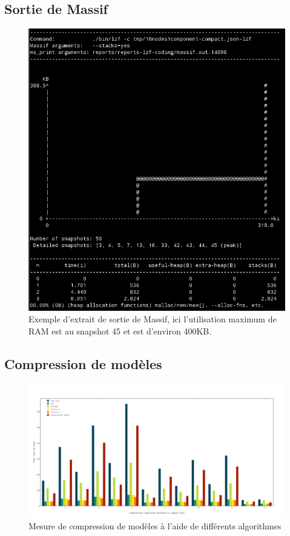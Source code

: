 \subsection{\label{massif}Sortie de Massif}
\begin{figure}[ht!]
\centering
\includegraphics[scale=0.7]{images/msprint.png}
\caption{Exemple d'extrait de sortie de Massif, ici l'utilisation maximum de RAM est au snapshot 45 et est d'environ 400KB.}
\end{figure}

\begin{landscape}
\subsection{\label{comp-tabde}Compression de modèles}
\begin{figure}[ht!]
\centering
\includegraphics[scale=0.45]{images/compression.png}
\caption{Mesure de compression de modèles à l'aide de différents algorithmes}
\end{figure}
\end{landscape}

